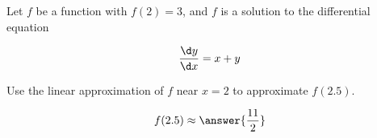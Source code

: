 \documentclass{ximera}
\author{Steven Gubkin}
\begin{document}
\begin{exercise}



Let $f$ be a function with $f(2) = 3$, and $f$ is a solution to the differential equation 

\[

\frac{\d y}{\d x} = x+y

\]

Use the linear approximation of $f$ near $x=2$ to approximate $f(2.5)$. 

\begin{prompt}
	\[
	f(2.5) \approx \answer{\frac{11}{2}}
	\]
\end{prompt}

\end{exercise}
\end{document}
